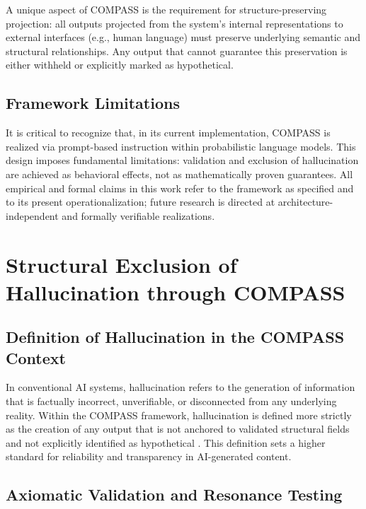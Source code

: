 \documentclass[11pt,a4paper]{article}
\begin{document}
A unique aspect of COMPASS is the requirement for structure-preserving projection: all outputs projected from the system’s internal representations to external interfaces (e.g., human language) must preserve underlying semantic and structural relationships. Any output that cannot guarantee this preservation is either withheld or explicitly marked as hypothetical.

\subsection{Framework Limitations}

It is critical to recognize that, in its current implementation, COMPASS is realized via prompt-based instruction within probabilistic language models. This design imposes fundamental limitations: validation and exclusion of hallucination are achieved as behavioral effects, not as mathematically proven guarantees. All empirical and formal claims in this work refer to the framework as specified and to its present operationalization; future research is directed at architecture-independent and formally verifiable realizations.

\section{Structural Exclusion of Hallucination through COMPASS}

\subsection{Definition of Hallucination in the COMPASS Context}

In conventional AI systems, hallucination refers to the generation of information that is factually incorrect, unverifiable, or disconnected from any underlying reality. Within the COMPASS framework, hallucination is defined more strictly as the creation of any output that is not anchored to validated structural fields and not explicitly identified as hypothetical \cite{ji2023hallucination}. This definition sets a higher standard for reliability and transparency in AI-generated content.

\subsection{Axiomatic Validation and Resonance Testing}
\end{document}
